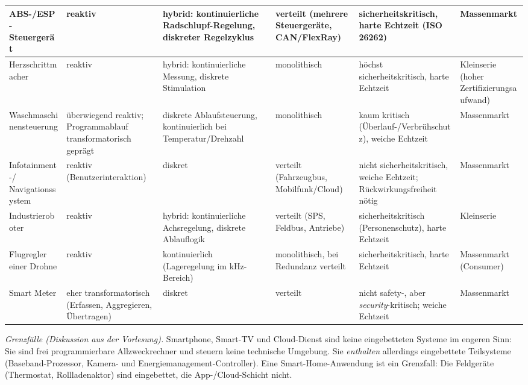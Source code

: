 \begin{loesung}
\begin{table}[h]
{\begin{tabular}{|p{2.9cm}|p{2.2cm}|p{3.1cm}|p{2.8cm}|p{3.6cm}|p{2.6cm}|}
ABS-/ESP-Steuer\-gerät &
reaktiv &
hybrid: kontinuierliche Radschlupf-Regelung, diskreter Regelzyklus &
verteilt (mehrere Steuergeräte, CAN/FlexRay) &
sicherheitskritisch, harte Echtzeit (ISO 26262) &
Massenmarkt \\ \hline

Herzschrittmacher &
reaktiv &
hybrid: kontinuierliche Messung, diskrete Stimulation &
monolithisch &
höchst sicherheitskritisch, harte Echtzeit &
Kleinserie (hoher Zertifizierungsaufwand) \\ \hline

Waschmaschinen\-steuerung &
überwiegend reaktiv; Programmablauf transformatorisch geprägt &
diskrete Ablaufsteuerung, kontinuierlich bei Temperatur/Drehzahl &
monolithisch &
kaum kritisch (Überlauf-/Verbrühschutz), weiche Echtzeit &
Massenmarkt \\ \hline

Infotainment-/ Navigationssystem &
reaktiv (Benutzerinteraktion) &
diskret &
verteilt (Fahrzeugbus, Mobilfunk/Cloud) &
nicht sicherheitskritisch, weiche Echtzeit; Rückwirkungsfreiheit nötig &
Massenmarkt \\ \hline

Industrieroboter &
reaktiv &
hybrid: kontinuierliche Achsregelung, diskrete Ablauflogik &
verteilt (SPS, Feldbus, Antriebe) &
sicherheitskritisch (Personenschutz), harte Echtzeit &
Kleinserie \\ \hline

Flugregler einer Drohne &
reaktiv &
kontinuierlich (Lageregelung im kHz-Bereich) &
monolithisch, bei Redundanz verteilt &
sicherheitskritisch, harte Echtzeit &
Massenmarkt (Consumer) \\ \hline

Smart Meter &
eher transformatorisch (Erfassen, Aggregieren, Übertragen) &
diskret &
verteilt &
nicht safety-, aber \emph{security}-kritisch; weiche Echtzeit &
Massenmarkt \\ \hline
\end{tabular}}
\end{table}

\emph{Grenzfälle (Diskussion aus der Vorlesung).} Smartphone, Smart-TV und Cloud-Dienst sind keine
eingebetteten Systeme im engeren Sinn: Sie sind frei programmierbare Allzweckrechner und steuern
keine technische Umgebung. Sie \emph{enthalten} allerdings eingebettete Teilsysteme (Baseband-Prozessor,
Kamera- und Energiemanagement-Controller). Eine Smart-Home-Anwendung ist ein Grenzfall: Die
Feldgeräte (Thermostat, Rollladenaktor) sind eingebettet, die App-/Cloud-Schicht nicht.


\end{loesung}

